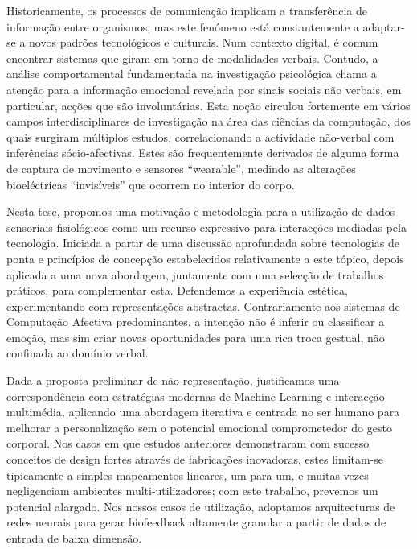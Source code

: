 

Historicamente, os processos de comunicação implicam a transferência de informação entre organismos, mas este fenómeno está constantemente a adaptar-se a novos padrões tecnológicos e culturais. Num contexto digital, é comum encontrar sistemas que giram em torno de modalidades verbais. Contudo, a análise comportamental fundamentada na investigação psicológica chama a atenção para a informação emocional revelada por sinais sociais não verbais, em particular, acções que são involuntárias. Esta noção circulou fortemente em vários campos interdisciplinares de investigação na área das ciências da computação, dos quais surgiram múltiplos estudos, correlacionando a actividade não-verbal com inferências sócio-afectivas. Estes são frequentemente derivados de alguma forma de captura de movimento e sensores ``wearable'', medindo as alterações bioeléctricas ``invisíveis'' que ocorrem no interior do corpo. 

Nesta tese, propomos uma motivação e metodologia para a utilização de dados sensoriais fisiológicos como um recurso expressivo para interacções mediadas pela tecnologia. Iniciada a partir de uma discussão aprofundada sobre tecnologias de ponta e princípios de concepção estabelecidos relativamente a este tópico, depois aplicada a uma nova abordagem, juntamente com uma selecção de trabalhos práticos, para complementar esta. Defendemos a experiência estética, experimentando com representações abstractas. Contrariamente aos sistemas de Computação Afectiva predominantes, a intenção não é inferir ou classificar a emoção, mas sim criar novas oportunidades para uma rica troca gestual, não confinada ao domínio verbal.

Dada a proposta preliminar de não representação, justificamos uma correspondência com estratégias modernas de Machine Learning e interacção multimédia, aplicando uma abordagem iterativa e centrada no ser humano para melhorar a personalização sem o potencial emocional comprometedor do gesto corporal. Nos casos em que estudos anteriores demonstraram com sucesso conceitos de design fortes através de fabricações inovadoras, estes limitam-se tipicamente a simples mapeamentos lineares, um-para-um, e muitas vezes negligenciam ambientes multi-utilizadores; com este trabalho, prevemos um potencial alargado. Nos nossos casos de utilização, adoptamos arquitecturas de redes neurais para gerar biofeedback altamente granular a partir de dados de entrada de baixa dimensão.


